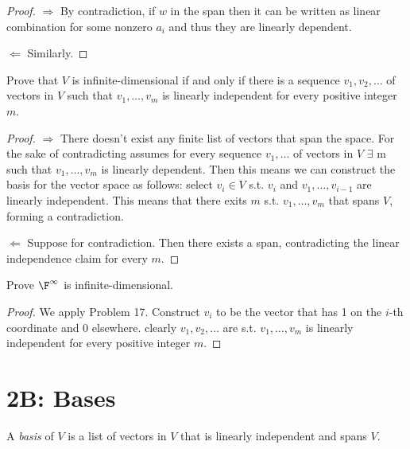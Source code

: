 \documentclass{extarticle}
\begin{document}
\begin{proof}
\(\Rightarrow\) By contradiction, if \(w\) in the span then it can be written 
as linear combination for some nonzero \(a_i\) and thus they are linearly dependent. 

\(\Leftarrow\) Similarly. 
\end{proof}

\begin{problem}{17}
Prove that \(V\) is infinite-dimensional if and only if there is a sequence 
\(v_1, v_2, \ldots\) of vectors in \(V\) such that \(v_1, \ldots, v_m\) is 
linearly independent for every positive integer \(m\). 
\end{problem}

\begin{proof}
\(\Rightarrow\) There doesn't exist any finite list of vectors that span the space. For 
the sake of contradicting assumes for every sequence  \(v_1, \ldots\) of 
vectors in \(V\) 
\(\exists\) m such that \(v_1, \ldots, v_m\)
is linearly dependent. Then this means we can construct the basis for the vector 
space as follows: select \(v_i \in V\) s.t. \(v_i\) and \(v_1, \ldots, v_{i-1}\)
are linearly independent. This means that there exits \(m\) s.t. \(v_1, \ldots, v_m\)
that spans \(V\), forming a contradiction. 

\(\Leftarrow\) Suppose for contradiction. Then there exists a span, contradicting 
the linear independence claim for every \(m\).
\end{proof}

\begin{problem}{18}
    Prove \(\F^\infty\) is infinite-dimensional. 
\end{problem}

\begin{proof}
We apply Problem 17. Construct \(v_i\) to be the vector that has 1 on the 
\(i\)-th coordinate and 0 elsewhere. clearly \(v_1, v_2, \ldots\) are s.t. 
\(v_1, \ldots, v_m\) is linearly independent for every positive integer \(m\).
\end{proof}

\newpage 
{}
\section*{2B: Bases}

\begin{definition}[basis]
    A \emph{basis} of \(V\) is a list of vectors in \(V\) that is linearly 
    independent and spans \(V\).
\end{definition}
\end{document}
